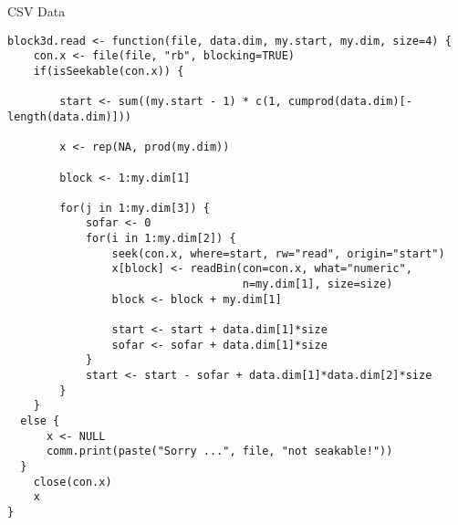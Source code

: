 \begin{frame}
  \begin{exampleblock}{CSV Data}\pause
    \begin{lstlisting}[title=3d Block Binary Reader]
block3d.read <- function(file, data.dim, my.start, my.dim, size=4) {
    con.x <- file(file, "rb", blocking=TRUE)
    if(isSeekable(con.x)) {

        start <- sum((my.start - 1) * c(1, cumprod(data.dim)[-length(data.dim)]))

        x <- rep(NA, prod(my.dim))
        
        block <- 1:my.dim[1]
        
        for(j in 1:my.dim[3]) {
            sofar <- 0
            for(i in 1:my.dim[2]) {
                seek(con.x, where=start, rw="read", origin="start")
                x[block] <- readBin(con=con.x, what="numeric",
                                    n=my.dim[1], size=size)
                block <- block + my.dim[1]

                start <- start + data.dim[1]*size
                sofar <- sofar + data.dim[1]*size
            }
            start <- start - sofar + data.dim[1]*data.dim[2]*size
        }
    }
  else {
      x <- NULL
      comm.print(paste("Sorry ...", file, "not seakable!"))
  }
    close(con.x)
    x
}
    \end{lstlisting}
  \end{exampleblock}
\end{frame}

